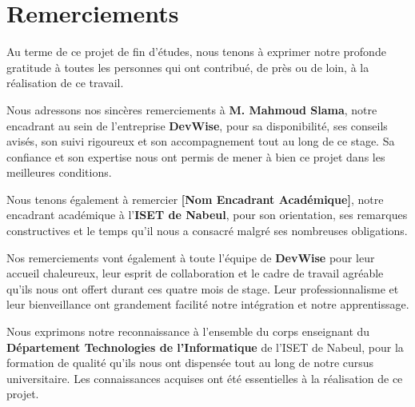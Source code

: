 
\chapter*{Remerciements}

\vspace{1cm}

Au terme de ce projet de fin d'\'{e}tudes, nous tenons \`{a} exprimer notre
profonde gratitude \`{a} toutes les personnes qui ont contribu\'{e}, de pr\`{e}s ou de
loin, \`{a} la r\'{e}alisation de ce travail.

\vspace{0.5cm}

Nous adressons nos sinc\`{e}res remerciements \`{a} \textbf{M. Mahmoud Slama}, notre
encadrant au sein de l'entreprise \textbf{DevWise}, pour sa disponibilit\'{e}, ses
conseils avis\'{e}s, son suivi rigoureux et son accompagnement tout au long de
ce stage. Sa confiance et son expertise nous ont permis de mener \`{a} bien ce
projet dans les meilleures conditions.

\vspace{0.5cm}

Nous tenons \'{e}galement \`{a} remercier \textbf{[Nom Encadrant Acad\'{e}mique]}, notre
encadrant acad\'{e}mique \`{a} l'\textbf{ISET de Nabeul}, pour son orientation, ses
remarques constructives et le temps qu'il nous a consacr\'{e} malgr\'{e} ses
nombreuses obligations.

\vspace{0.5cm}

Nos remerciements vont \'{e}galement \`{a} toute l'\'{e}quipe de \textbf{DevWise} pour
leur accueil chaleureux, leur esprit de collaboration et le cadre de travail
agr\'{e}able qu'ils nous ont offert durant ces quatre mois de stage. Leur
professionnalisme et leur bienveillance ont grandement facilit\'{e} notre
int\'{e}gration et notre apprentissage.

\vspace{0.5cm}

Nous exprimons notre reconnaissance \`{a} l'ensemble du corps enseignant du
\textbf{D\'{e}partement Technologies de l'Informatique} de l'ISET de Nabeul, pour
la formation de qualit\'{e} qu'ils nous ont dispens\'{e}e tout au long de notre
cursus universitaire. Les connaissances acquises ont \'{e}t\'{e} essentielles \`{a}
la r\'{e}alisation de ce projet.

